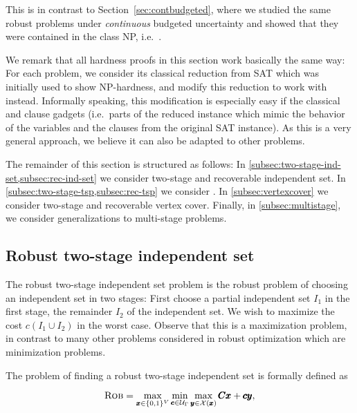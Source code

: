 This is in contrast to Section~\ref{sec:contbudgeted}, where we studied the same robust problems under \emph{continuous} budgeted uncertainty and showed that they were contained in the class NP, i.e.\ .

We remark that all hardness proofs in this section work basically the same way: For each problem, we consider its classical reduction from SAT which was initially used to show NP-hardness, and modify this reduction to work with {\radj} instead. Informally speaking, this modification is especially easy if the classical  and clause gadgets (i.e.\ parts of the reduced instance which mimic the behavior of the variables and the clauses from the original SAT instance). As this is a very general approach, we believe it can also be adapted to other problems.

The remainder of this section is structured as follows: In \cref{subsec:two-stage-ind-set,subsec:rec-ind-set} we consider two-stage and recoverable independent set. In \cref{subsec:two-stage-tsp,subsec:rec-tsp} we consider . In \cref{subsec:vertexcover} we consider two-stage and recoverable vertex cover. Finally, in \cref{subsec:multistage}, we consider generalizations to multi-stage problems.



\subsection{Robust two-stage independent set}
\label{subsec:two-stage-ind-set}


The robust two-stage independent set problem is the robust problem of choosing an independent set in two stages: First choose a partial independent set $I_1$ in the first stage,  the remainder $I_2$ of the independent set. We wish to maximize the cost $c(I_1 \cup I_2)$ in the worst case. Observe that this is a maximization problem, in contrast to many other problems considered in robust optimization which are minimization problems.

 The problem of finding a robust two-stage independent set is formally defined as

\begin{equation*}
\textsc{Rob} = \max_{\pmb x \in \{ 0,1 \}^V} \min_{\pmb c \in \mathcal{U}_\Gamma } \max_{\pmb y \in \mathcal{X}(\pmb x)} \pmb C \pmb x + \pmb c \pmb y, 
\end{equation*} 

